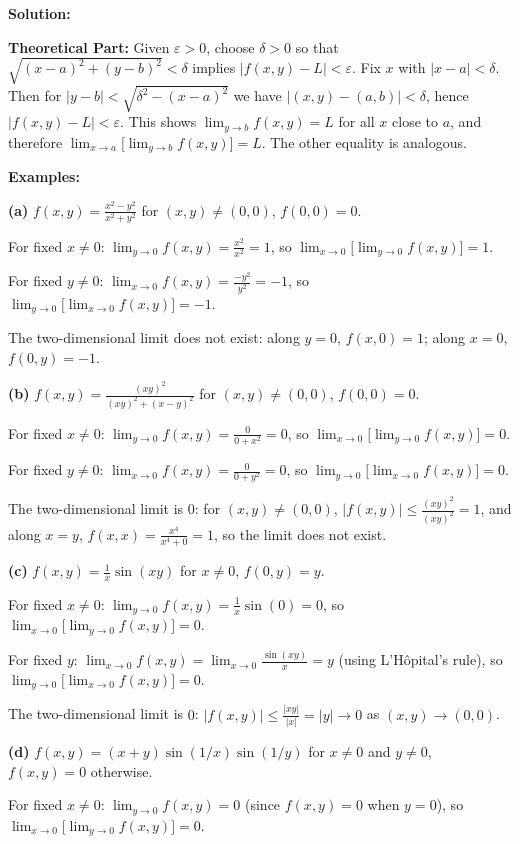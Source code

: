 \bigskip\noindent\textbf{Solution:}

\textbf{Theoretical Part:} Given $\varepsilon>0$, choose $\delta>0$ so that $\sqrt{(x-a)^2+(y-b)^2}<\delta$ implies $|f(x,y)-L|<\varepsilon$. Fix $x$ with $|x-a|<\delta$. Then for $|y-b|<\sqrt{\delta^2-(x-a)^2}$ we have $|(x,y)-(a,b)|<\delta$, hence $|f(x,y)-L|<\varepsilon$. This shows $\lim_{y\to b}f(x,y)=L$ for all $x$ close to $a$, and therefore $\lim_{x\to a}\big[\lim_{y\to b}f(x,y)\big]=L$. The other equality is analogous.

\textbf{Examples:}

\noindent\textbf{(a)} $f(x,y)=\frac{x^2-y^2}{x^2+y^2}$ for $(x,y)\neq(0,0)$, $f(0,0)=0$.

For fixed $x\neq0$: $\lim_{y\to0}f(x,y)=\frac{x^2}{x^2}=1$, so $\lim_{x\to0}\big[\lim_{y\to0}f(x,y)\big]=1$.

For fixed $y\neq0$: $\lim_{x\to0}f(x,y)=\frac{-y^2}{y^2}=-1$, so $\lim_{y\to0}\big[\lim_{x\to0}f(x,y)\big]=-1$.

The two-dimensional limit does not exist: along $y=0$, $f(x,0)=1$; along $x=0$, $f(0,y)=-1$.

\noindent\textbf{(b)} $f(x,y)=\frac{(xy)^2}{(xy)^2+(x-y)^2}$ for $(x,y)\neq(0,0)$, $f(0,0)=0$.

For fixed $x\neq0$: $\lim_{y\to0}f(x,y)=\frac{0}{0+x^2}=0$, so $\lim_{x\to0}\big[\lim_{y\to0}f(x,y)\big]=0$.

For fixed $y\neq0$: $\lim_{x\to0}f(x,y)=\frac{0}{0+y^2}=0$, so $\lim_{y\to0}\big[\lim_{x\to0}f(x,y)\big]=0$.

The two-dimensional limit is $0$: for $(x,y)\neq(0,0)$, $|f(x,y)|\leq\frac{(xy)^2}{(xy)^2}=1$, and along $x=y$, $f(x,x)=\frac{x^4}{x^4+0}=1$, so the limit does not exist.

\noindent\textbf{(c)} $f(x,y)=\frac{1}{x}\sin(xy)$ for $x\neq0$, $f(0,y)=y$.

For fixed $x\neq0$: $\lim_{y\to0}f(x,y)=\frac{1}{x}\sin(0)=0$, so $\lim_{x\to0}\big[\lim_{y\to0}f(x,y)\big]=0$.

For fixed $y$: $\lim_{x\to0}f(x,y)=\lim_{x\to0}\frac{\sin(xy)}{x}=y$ (using L'Hôpital's rule), so $\lim_{y\to0}\big[\lim_{x\to0}f(x,y)\big]=0$.

The two-dimensional limit is $0$: $|f(x,y)|\leq\frac{|xy|}{|x|}=|y|\to0$ as $(x,y)\to(0,0)$.

\noindent\textbf{(d)} $f(x,y)=(x+y)\sin(1/x)\sin(1/y)$ for $x\neq0$ and $y\neq0$, $f(x,y)=0$ otherwise.

For fixed $x\neq0$: $\lim_{y\to0}f(x,y)=0$ (since $f(x,y)=0$ when $y=0$), so $\lim_{x\to0}\big[\lim_{y\to0}f(x,y)\big]=0$.


